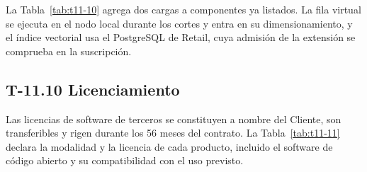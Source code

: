 \documentclass[11pt]{article}
\begin{document}
La Tabla~\mbox{\ref{tab:t11-10}} agrega dos cargas a componentes ya listados. La fila virtual se ejecuta en el nodo local durante los cortes y entra en su dimensionamiento, y el índice vectorial usa el PostgreSQL de Retail, cuya admisión de la extensión se comprueba en la suscripción.

\subsection{T-11.10 Licenciamiento}\label{t-11-10}

Las licencias de software de terceros se constituyen a nombre del Cliente, son transferibles y rigen durante los 56 meses del contrato. La Tabla~\mbox{\ref{tab:t11-11}} declara la modalidad y la licencia de cada producto, incluido el software de código abierto y su compatibilidad con el uso previsto.
\end{document}
